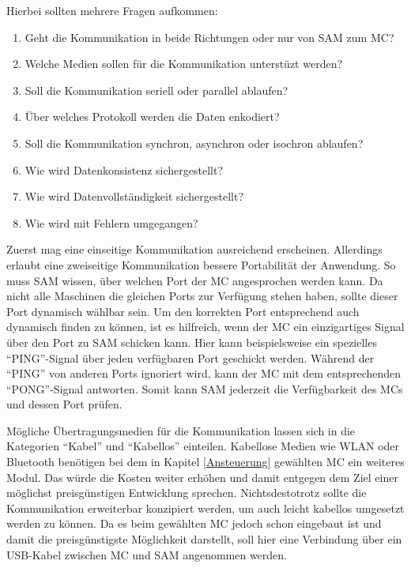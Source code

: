 Hierbei sollten mehrere Fragen aufkommen:
\begin{enumerate}
    \item Geht die Kommunikation in beide Richtungen oder nur von \ac{SAM} zum \ac{MC}?
    \item Welche Medien sollen für die Kommunikation unterstüzt werden?
    \item Soll die Kommunikation seriell oder parallel ablaufen?
    \item Über welches Protokoll werden die Daten enkodiert?
    \item Soll die Kommunikation synchron, asynchron oder isochron ablaufen?
    \item Wie wird Datenkonsistenz sichergestellt?
    \item Wie wird Datenvollständigkeit sichergestellt?
    \item Wie wird mit Fehlern umgegangen?
\end{enumerate}

Zuerst mag eine einseitige Kommunikation ausreichend erscheinen.
Allerdings erlaubt eine zweiseitige Kommunikation bessere Portabilität der Anwendung.
So muss \ac{SAM} wissen, über welchen Port der \ac{MC} angesprochen werden kann.
Da nicht alle Maschinen die gleichen Ports zur Verfügung stehen haben, sollte dieser Port dynamisch wählbar sein. \newline
Um den korrekten Port entsprechend auch dynamisch finden zu können, ist es hilfreich, wenn der \ac{MC} ein einzigartiges Signal über den Port zu \ac{SAM} schicken kann.
Hier kann beispielsweise ein spezielles \enquote{PING}-Signal über jeden verfügbaren Port geschickt werden.
Während der \enquote{PING} von anderen Ports ignoriert wird, kann der \ac{MC} mit dem entsprechenden \enquote{PONG}-Signal antworten.
Somit kann \ac{SAM} jederzeit die Verfügbarkeit des \ac{MC}s und dessen Port prüfen.

Mögliche Übertragungsmedien für die Kommunikation lassen sich in die Kategorien \enquote{Kabel} und \enquote{Kabellos} einteilen.
Kabellose Medien wie WLAN oder Bluetooth benötigen bei dem in Kapitel \ref{Ansteuerung} gewählten \ac{MC} ein weiteres Modul.
Das würde die Kosten weiter erhöhen und damit entgegen dem Ziel einer möglichst preisgünstigen Entwicklung sprechen.
Nichtsdestotrotz sollte die Kommunikation erweiterbar konzipiert werden, um auch leicht kabellos umgesetzt werden zu können. \newline
Da es beim gewählten \ac{MC} jedoch schon eingebaut ist und damit die preisgünstigste Möglichkeit darstellt, soll hier eine Verbindung über ein USB-Kabel zwischen \ac{MC} und \ac{SAM} angenommen werden.

